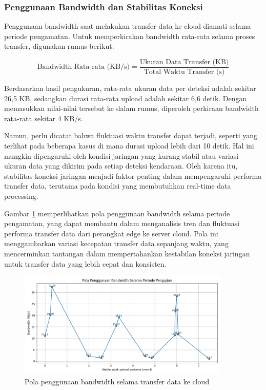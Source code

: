 \subsubsection{Penggunaan Bandwidth dan Stabilitas Koneksi}

Penggunaan bandwidth saat melakukan transfer data ke cloud diamati selama periode pengamatan. Untuk memperkirakan bandwidth rata-rata selama proses transfer, digunakan rumus berikut:

\begin{equation}
  \mbox{Bandwidth Rata-rata (KB/s)} = \frac{\mbox{Ukuran Data Transfer (KB)}}{\mbox{Total Waktu Transfer (s)}}
\end{equation}

Berdasarkan hasil pengukuran, rata-rata ukuran data per deteksi adalah sekitar 26,5 KB, sedangkan durasi rata-rata upload adalah sekitar 6,6 detik. Dengan memasukkan nilai-nilai tersebut ke dalam rumus, diperoleh perkiraan bandwidth rata-rata sekitar 4 KB/s.

Namun, perlu dicatat bahwa fluktuasi waktu transfer dapat terjadi, seperti yang terlihat pada beberapa kasus di mana durasi upload lebih dari 10 detik. Hal ini mungkin dipengaruhi oleh kondisi jaringan yang kurang stabil atau variasi ukuran data yang dikirim pada setiap deteksi kendaraan. Oleh karena itu, stabilitas koneksi jaringan menjadi faktor penting dalam mempengaruhi performa transfer data, terutama pada kondisi yang membutuhkan real-time data processing.

Gambar \ref{fig:bandwidth_usage} memperlihatkan pola penggunaan bandwidth selama periode pengamatan, yang dapat membantu dalam menganalisis tren dan fluktuasi performa transfer data dari perangkat edge ke server cloud. Pola ini menggambarkan variasi kecepatan transfer data sepanjang waktu, yang mencerminkan tantangan dalam mempertahankan kestabilan koneksi jaringan untuk transfer data yang lebih cepat dan konsisten.

\begin{figure}[htbp]
  \centering
  \includegraphics[width=0.9\textwidth]{gambar/bab4-bandwidth.png}
  \caption{Pola penggunaan bandwidth selama transfer data ke cloud}
  \label{fig:bandwidth_usage}
\end{figure}

